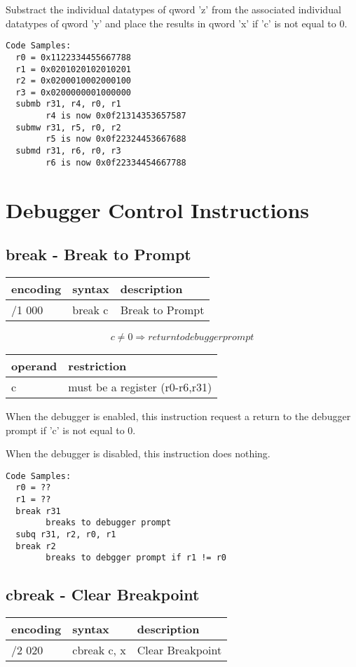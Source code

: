 \documentclass[letterpaper,10pt,openright,twoside,onecolumn]{book}
\begin{document}
  Substract the individual datatypes of qword 'z' from the associated individual
  datatypes of qword 'y' and place the results in qword 'x' if 'c' is not equal
  to 0.

  \begin{verbatim}
Code Samples:
  r0 = 0x1122334455667788
  r1 = 0x0201020102010201
  r2 = 0x0200010002000100
  r3 = 0x0200000001000000
  submb r31, r4, r0, r1
        r4 is now 0x0f21314353657587
  submw r31, r5, r0, r2
        r5 is now 0x0f22324453667688
  submd r31, r6, r0, r3
        r6 is now 0x0f22334454667788
  \end{verbatim}
\clearpage\section{Debugger Control Instructions}
\subsection{break - Break to Prompt}
  \begin{tabular}{|l|l|l|}
   \hline
    encoding & syntax & description \\
   \hline
    /1 000 & break c & Break to Prompt \\
   \hline
  \end{tabular}

  \begin{displaymath} c \neq 0 \Rightarrow return to debugger prompt\end{displaymath}

  \flushleft
  \begin{tabular}{|l|l|}
   \hline
    operand & restriction \\
   \hline
    c & must be a register (r0-r6,r31) \\
   \hline
  \end{tabular}

  When the debugger is enabled, this instruction request a return to the debugger
  prompt if 'c' is not equal to 0.

  When the debugger is disabled, this instruction does nothing.

  \begin{verbatim}
Code Samples:
  r0 = ??
  r1 = ??
  break r31
        breaks to debugger prompt
  subq r31, r2, r0, r1
  break r2
        breaks to debgger prompt if r1 != r0
  \end{verbatim}
\newpage\subsection{cbreak - Clear Breakpoint}
  \begin{tabular}{|l|l|l|}
   \hline
    encoding & syntax & description \\
   \hline
    /2 020 & cbreak c, x & Clear Breakpoint \\
   \hline
  \end{tabular}
\end{document}
